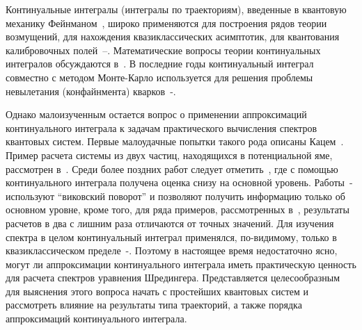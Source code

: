 \documentclass[11pt]{article}
\begin{document}
Континуальные интегралы (интегралы по траекториям), введенные в квантовую механику Фейнманом~\cite{1,2}, широко применяются для
построения рядов теории возмущений, для нахождения квазиклассических асимптотик, для квантования калибровочных полей~\cite{3}--\cite{7}.
Математические вопросы теории континуальных интегралов обсуждаются в~\cite{8,9}.
В последние годы континуальный интеграл совместно с методом Монте-Карло используется для решения проблемы невылетания
(конфайнмента) кварков~\cite{10}-\cite{12}.

Однако малоизученным остается вопрос о применении аппроксимаций континуального интеграла к задачам практического вычисления
спектров квантовых систем.
Первые малоудачные попытки такого рода описаны Кацем~\cite{13}.
Пример расчета системы из двух частиц, находящихся в потенциальной яме, рассмотрен в~\cite{14}.
Среди более поздних работ следует отметить~\cite{15}, где с помощью континуального интеграла получена оценка снизу на основной уровень.
Работы~\cite{13}-\cite{15} используют ``виковский поворот'' и позволяют получить информацию только об основном уровне, кроме того,
для ряда примеров, рассмотренных в~\cite{13}, результаты расчетов в два с лишним раза отличаются от точных значений.
Для изучения спектра в целом континуальный интеграл применялся, по-видимому, только в квазиклассическом пределе~\cite{16}-\cite{18}.
Поэтому в настоящее время недостаточно ясно, могут ли аппроксимации континуального интеграла иметь практическую ценность для
расчета спектров уравнения Шредингера.
Представляется целесообразным для выяснения этого вопроса начать с простейших квантовых систем и рассмотреть влияние на
результаты типа траекторий, а также порядка аппроксимаций континуального интеграла.


%
\end{document}
